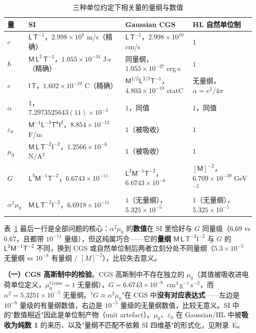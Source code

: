 \documentclass[12pt,a4paper]{article}
\begin{document}
\begin{table}[h]
\centering
\caption{三种单位约定下相关量的量纲与数值}
\label{tab:units}
\scriptsize
\begin{tabular}{@{}llll@{}}
\toprule
\textbf{量} & \textbf{SI} & \textbf{Gaussian CGS} & \textbf{HL 自然单位制} \\
\midrule
$c$ & $\mathsf{L\,T^{-1}}$，$2.998\times10^{8}$ m/s（精确） & $\mathsf{L\,T^{-1}}$，$2.998\times10^{10}$ cm/s & $1$ \\
$\hbar$ & $\mathsf{M\,L^2\,T^{-1}}$，$1.055\times10^{-34}$ J$\cdot$s（精确） & 同量纲，$1.055\times10^{-27}$ erg$\cdot$s & $1$ \\
$e$ & $\mathsf{I\,T}$，$1.602\times10^{-19}$ C（精确） & $\mathsf{M^{1/2}L^{3/2}T^{-1}}$，$4.803\times10^{-10}$ statC & 无量纲，$\alpha=e^2/4\pi$ \\
$\alpha$ & $1$，$7.2973525643(11)\times10^{-3}$ & $1$，同值 & $1$，同值 \\
$\varepsilon_0$ & $\mathsf{M^{-1}L^{-3}T^{4}I^{2}}$，$8.854\times10^{-12}$ F/m & $1$（被吸收） & $1$ \\
$\mu_0$ & $\mathsf{M\,L\,T^{-2}I^{-2}}$，$1.2566\times10^{-6}$ N/A$^2$ & $1$（被吸收） & $1$ \\
$G$ & $\mathsf{L^{3}M^{-1}T^{-2}}$，$6.6743\times10^{-11}$ & $\mathsf{L^{3}M^{-1}T^{-2}}$，$6.6743\times10^{-8}$ & $\mathsf{[M]^{-2}}$，$6.709\times10^{-39}$ GeV$^{-2}$ \\
$\alpha^2\mu_0$ & $\mathsf{M\,L\,T^{-2}I^{-2}}$，$6.6918\times10^{-11}$ & $1$（无量纲），$5.325\times10^{-5}$ & $1$（无量纲），$5.325\times10^{-5}$ \\
\bottomrule
\end{tabular}
\end{table}

\noindent 表~\ref{tab:units} 最后一行是全部问题的核心：$\alpha^2\mu_0$ 的\textbf{数值}在 SI 里恰好与 $G$ 同量级（$6.69$ vs $6.67$，且都带 $10^{-11}$ 量级），但这纯属巧合——它的\textbf{量纲} $\mathsf{M\,L\,T^{-2}I^{-2}}$ 与 $G$ 的 $\mathsf{L^{3}M^{-1}T^{-2}}$ 不同，换到 CGS 或自然单位制后两者立刻分处不同量纲（$5.3\times10^{-5}$ 无量纲 vs $10^{-8}$ 有量纲 / $[M]^{-2}$），比较失去意义。

\textbf{（一）CGS 高斯制中的检验}。CGS 高斯制中不存在独立的 $\mu_0$（其值被吸收进电荷单位定义，$\mu_0^{\text{Gauss}} = 1$ 无量纲），$G = 6.6743\times10^{-8}$~cm$^3$\,g$^{-1}$\,s$^{-2}$，而 $\alpha^2 = 5.3251\times10^{-5}$ 无量纲。"$G \approx \alpha^2\mu_0$"在 CGS 中\textbf{没有对应表达式}——左边是 $10^{-8}$ 量级的有量纲数值，右边是 $10^{-5}$ 量级的无量纲数值，比较无意义。SI 中的"数值相近"因此是单位制产物（unit artefact）。$\mu_0$、$\varepsilon_0$ 在 Gaussian/HL 中被\textbf{吸收为纯数 1} 的来历、以及"量纲不匹配不依赖 SI 四维基"的形式化，见附录~E。
\end{document}
